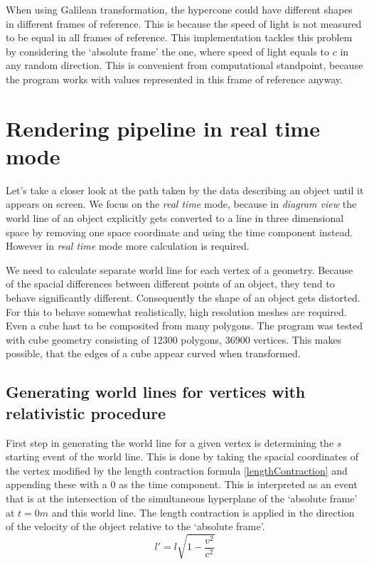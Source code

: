 \documentclass{egpubl}
\begin{document}
When using Galilean transformation, the hypercone could have different shapes in different frames of reference. This is because the speed of light is not measured to be equal in all frames of reference. This implementation tackles this problem by considering the `absolute frame' the one, where speed of light equals to $c$ in any random direction. This is convenient from computational standpoint, because the program works with values represented in this frame of reference anyway.

\section{Rendering pipeline in real time mode}
Let's take a closer look at the path taken by the data describing an object until it appears on screen. We focus on the \emph{real time} mode, because in \emph{diagram view} the world line of an object explicitly gets converted to a line in three dimensional space by removing one space coordinate and using the time component instead. However in \emph{real time} mode more calculation is required.

We need to calculate separate world line for each vertex of a geometry. Because of the spacial differences between different points of an object, they tend to behave significantly different. Consequently the shape of an object gets distorted. For this to behave somewhat realistically, high resolution meshes are required. Even a cube hast to be composited from many polygons. The program was tested with cube geometry consisting of 12300 polygons, 36900 vertices. This makes possible, that the edges of a cube appear curved when transformed.

\subsection{Generating world lines for vertices with relativistic procedure}
\label{sec:genRelProc}
First step in generating the world line for a given vertex is determining the $s$ starting event of the world line. This is done by taking the spacial coordinates of the vertex modified by the length contraction formula \ref{lengthContraction} and appending these with a $0$ as the time component. This is interpreted as an event that is at the intersection of the simultaneous hyperplane of the `absolute frame' at $t = 0 m$ and this world line. The length contraction is applied in the direction of the velocity of the object relative to the `absolute frame'.
\begin{equation}
\label{lengthContraction}
l' =l\sqrt{1 - \frac{v^2}{c^2}}
\end{equation}
\end{document}
